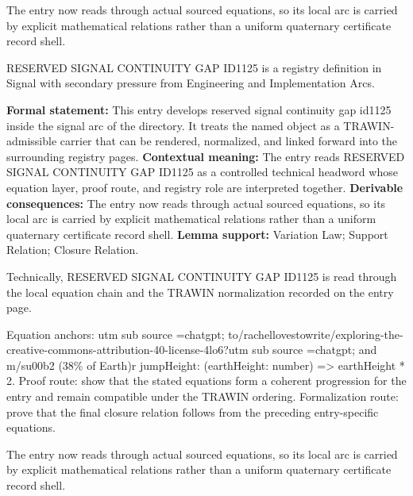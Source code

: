 The entry now reads through actual sourced equations, so its local arc is carried by explicit mathematical relations rather than a uniform quaternary certificate record shell.
\clearpage


\begingroup\small
{}
RESERVED SIGNAL CONTINUITY GAP ID1125 is a registry definition in Signal with secondary pressure from Engineering and Implementation Arcs.

\begingroup\footnotesize\setlength{\emergencystretch}{3em}\sloppy
\textbf{Formal statement:} This entry develops reserved signal continuity gap id1125 inside the signal arc of the directory. It treats the named object as a TRAWIN-admissible carrier that can be rendered, normalized, and linked forward into the surrounding registry pages. \textbf{Contextual meaning:} The entry reads RESERVED SIGNAL CONTINUITY GAP ID1125 as a controlled technical headword whose equation layer, proof route, and registry role are interpreted together. \textbf{Derivable consequences:} The entry now reads through actual sourced equations, so its local arc is carried by explicit mathematical relations rather than a uniform quaternary certificate record shell. \textbf{Lemma support:} Variation Law; Support Relation; Closure Relation.\par
\endgroup

Technically, RESERVED SIGNAL CONTINUITY GAP ID1125 is read through the local equation chain and the TRAWIN normalization recorded on the entry page.

Equation anchors: utm sub source =chatgpt; to/rachellovestowrite/exploring-the-creative-commons-attribution-40-license-4lo6?utm sub source =chatgpt; and m/su00b2 (38\% of Earth)r jumpHeight: (earthHeight: number) => earthHeight * 2. Proof route: show that the stated equations form a coherent progression for the entry and remain compatible under the TRAWIN ordering. Formalization route: prove that the final closure relation follows from the preceding entry-specific equations.

The entry now reads through actual sourced equations, so its local arc is carried by explicit mathematical relations rather than a uniform quaternary certificate record shell.
\endgroup

